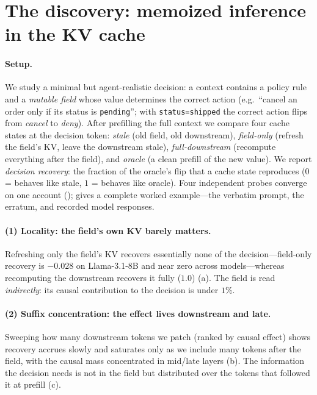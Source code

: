 \section{The discovery: memoized inference in the KV cache}
\label{sec:mechanism}

\paragraph{Setup.} We study a minimal but agent-realistic decision: a context contains a policy rule and a
\emph{mutable field} whose value determines the correct action (e.g.\ ``cancel an order only if its status
is \texttt{pending}''; with \texttt{status=shipped} the correct action flips from \emph{cancel} to
\emph{deny}). After prefilling the full context we compare four cache states at the decision token:
\emph{stale} (old field, old downstream), \emph{field-only} (refresh the field's KV, leave the downstream
stale), \emph{full-downstream} (recompute everything after the field), and \emph{oracle} (a clean prefill
of the new value). We report \emph{decision recovery}: the fraction of the oracle's flip that a cache
state reproduces ($0$ = behaves like stale, $1$ = behaves like oracle). Four independent probes converge
on one account ();  gives a complete worked example---the verbatim
prompt, the erratum, and recorded model responses.

\paragraph{(1) Locality: the field's own KV barely matters.} Refreshing only the field's KV recovers
essentially none of the decision---field-only recovery is $-0.028$ on Llama-3.1-8B and near zero across
models---whereas recomputing the downstream recovers it fully ($1.0$) (a). The field is
read \emph{indirectly}: its causal contribution to the decision is under $1\%$.

\paragraph{(2) Suffix concentration: the effect lives downstream and late.} Sweeping how many downstream
tokens we patch (ranked by causal effect) shows recovery accrues slowly and saturates only as we include
many tokens after the field, with the causal mass concentrated in mid/late layers
(b). The information the decision needs is not in the field but distributed over the tokens
that followed it at prefill (c).

